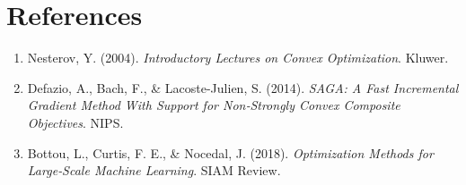 \documentclass[11pt]{article}
\begin{document}
\section*{References}
\begin{enumerate}
\item Nesterov, Y. (2004). \emph{Introductory Lectures on Convex Optimization}. Kluwer.
\item Defazio, A., Bach, F., \& Lacoste-Julien, S. (2014). \emph{SAGA: A Fast Incremental Gradient Method With Support for Non‑Strongly Convex Composite Objectives}. NIPS.
\item Bottou, L., Curtis, F. E., \& Nocedal, J. (2018). \emph{Optimization Methods for Large‑Scale Machine Learning}. SIAM Review.
\end{enumerate}
\end{document}
